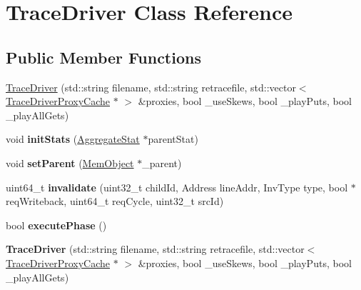 \hypertarget{classTraceDriver}{\section{Trace\-Driver Class Reference}
\label{classTraceDriver}
}
\subsection*{Public Member Functions}
\begin{DoxyCompactItemize}
\item 
\hyperlink{classTraceDriver_ae708770486c6440a8eb8701ffd6fad50}{Trace\-Driver} (std\-::string filename, std\-::string retracefile, std\-::vector$<$ \hyperlink{classTraceDriverProxyCache}{Trace\-Driver\-Proxy\-Cache} $\ast$ $>$ \&proxies, bool \-\_\-use\-Skews, bool \-\_\-play\-Puts, bool \-\_\-play\-All\-Gets)
\item 
\hypertarget{classTraceDriver_aca88e790d641f617260c5ab78f0d4bda}{void {\bfseries init\-Stats} (\hyperlink{classAggregateStat}{Aggregate\-Stat} $\ast$parent\-Stat)}\label{classTraceDriver_aca88e790d641f617260c5ab78f0d4bda}

\item 
\hypertarget{classTraceDriver_a716278a5e66ad1f6667d56cc97107594}{void {\bfseries set\-Parent} (\hyperlink{classMemObject}{Mem\-Object} $\ast$\-\_\-parent)}\label{classTraceDriver_a716278a5e66ad1f6667d56cc97107594}

\item 
\hypertarget{classTraceDriver_af21744a0b4846afcfd7ccd410895203e}{uint64\-\_\-t {\bfseries invalidate} (uint32\-\_\-t child\-Id, Address line\-Addr, Inv\-Type type, bool $\ast$req\-Writeback, uint64\-\_\-t req\-Cycle, uint32\-\_\-t src\-Id)}\label{classTraceDriver_af21744a0b4846afcfd7ccd410895203e}

\item 
\hypertarget{classTraceDriver_af016df78eb21621e0ee391056e0695df}{bool {\bfseries execute\-Phase} ()}\label{classTraceDriver_af016df78eb21621e0ee391056e0695df}

\item 
\hypertarget{classTraceDriver_ae708770486c6440a8eb8701ffd6fad50}{{\bfseries Trace\-Driver} (std\-::string filename, std\-::string retracefile, std\-::vector$<$ \hyperlink{classTraceDriverProxyCache}{Trace\-Driver\-Proxy\-Cache} $\ast$ $>$ \&proxies, bool \-\_\-use\-Skews, bool \-\_\-play\-Puts, bool \-\_\-play\-All\-Gets)}\label{classTraceDriver_ae708770486c6440a8eb8701ffd6fad50}


\end{DoxyCompactItemize}
